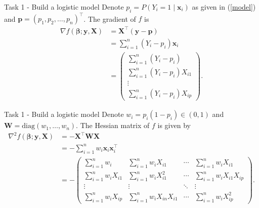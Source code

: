 \documentclass[
  ignorenonframetext,
]{beamer}
\begin{document}
\begin{frame}{Task 1 - Build a logistic model}
\protect\hypertarget{task-1---build-a-logistic-model-3}{}
Denote \(p_i=P(Y_i=1\mid\mathbf{x}_i)\) as given in (\ref{model}) and
\(\mathbf{p}=(p_1,p_2,\ldots,p_n)^\top\). The gradient of \(f\) is
\begin{align*}
\nabla f(\boldsymbol{\beta};\mathbf{y},\mathbf{X})&=\mathbf{X}^\top(\mathbf{y}-\mathbf{p})\\
&=\sum_{i=1}^n(Y_i-p_i)\mathbf{x}_i\\
&=\begin{pmatrix}
\sum_{i=1}^n(Y_i-p_i)\\ \sum_{i=1}^n(Y_i-p_i)X_{i1}\\ \vdots\\ \sum_{i=1}^n(Y_i-p_i)X_{ip}\end{pmatrix}.
\end{align*}
\end{frame}

\begin{frame}{Task 1 - Build a logistic model}
\protect\hypertarget{task-1---build-a-logistic-model-4}{}
Denote \(w_i=p_i(1-p_i)\in(0,1)\) and
\(\mathbf{W}=\mathrm{diag}(w_1,\ldots,w_n)\). The Hessian matrix of
\(f\) is given by \begin{align*}
\nabla^2 f(\boldsymbol{\beta};\mathbf{y},\mathbf{X})&=-\mathbf{X}^\top\mathbf{W}\mathbf{X}\\
&=-\sum_{i=1}^nw_i\mathbf{x}_i\mathbf{x}_i^\top\\
&=-\begin{pmatrix}
\sum_{i=1}^nw_i & \sum_{i=1}^nw_iX_{i1} & \cdots & \sum_{i=1}^nw_iX_{i1} \\ 
\sum_{i=1}^nw_iX_{i1} & \sum_{i=1}^nw_iX_{i1}^2 & \cdots & \sum_{i=1}^nw_iX_{i1}X_{ip} \\ 
\vdots & \vdots & \ddots & \vdots \\ 
\sum_{i=1}^nw_iX_{ip} & \sum_{i=1}^nw_iX_{in}X_{i1} & \cdots & \sum_{i=1}^nw_iX_{ip}^2
\end{pmatrix}.
\end{align*}
\end{frame}
\end{document}
